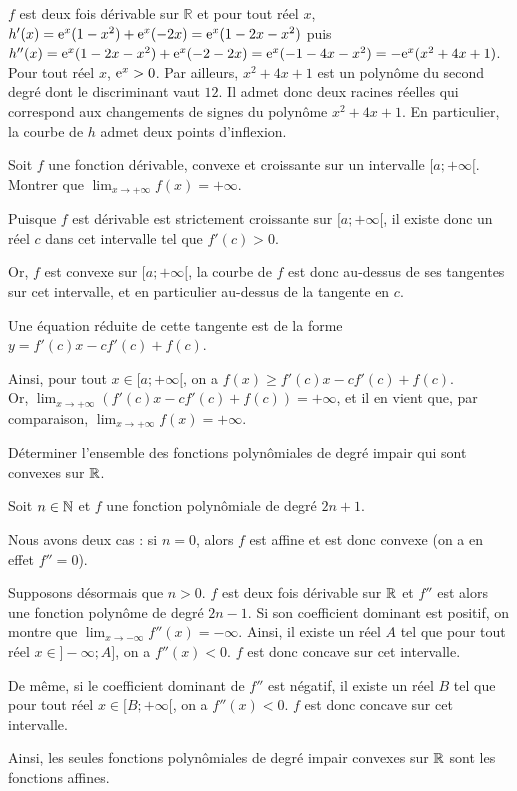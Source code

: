 \documentclass[11pt,fleqn, openany]{book} %
\begin{document}
\begin{solution}$f$ est deux fois dérivable sur $\mathbb{R}$ et pour tout réel $x$, $h'(x)=\mathrm{e}^x(1-x^2)+\mathrm{e}^x(-2x)=\mathrm{e}^x(1-2x-x^2)$ puis $h''(x)=\mathrm{e}^x(1-2x-x^2)+\mathrm{e}^x(-2-2x)=\mathrm{e}^x(-1-4x-x^2)=-\mathrm{e}^x(x^2+4x+1)$. Pour tout réel $x$, $\mathrm{e}^x>0$. Par ailleurs, $x^2+4x+1$ est un polynôme du second degré dont le discriminant vaut $12$. Il admet donc deux racines réelles qui correspond aux changements de signes du polynôme $x^2+4x+1$. En particulier, la courbe de $h$ admet deux points d'inflexion.\end{solution}



\begin{exercise}Soit $f$ une fonction dérivable, convexe et croissante sur un intervalle $[a;+\infty[$. \\Montrer que $\displaystyle\lim_{x \to + \infty}f(x)=+\infty$. \end{exercise}

\begin{solution}
Puisque \(f\) est dérivable est strictement croissante sur \([a;+\infty[\), il existe donc un réel \(c\) dans cet intervalle tel que \(f'(c)>0\).

 Or, \(f\) est convexe sur \([a;+\infty[\), la courbe de \(f\) est donc au-dessus de ses tangentes sur cet intervalle, et en particulier au-dessus de la tangente en \(c\). 

 Une équation réduite de cette tangente est de la forme \(y = f'(c)x -cf'(c)+f(c)\). 

 Ainsi, pour tout \(x \in [a;+\infty[\), on a \(f(x) \geqslant f'(c)x -cf'(c)+f(c)\). \\Or, \(\displaystyle\lim_{x\to +\infty}(f'(c)x -cf'(c)+f(c))=+\infty\), et il en vient que, par comparaison, \(\displaystyle\lim_{x \to + \infty}f(x)=+\infty\).\end{solution}
 
 \begin{exercise}Déterminer l'ensemble des fonctions polynômiales de degré impair qui sont convexes sur $\mathbb{R}$.\newpage \end{exercise}
 
 \begin{solution}
Soit $n\in\mathbb{N}$ et $f$ une fonction polynômiale de degré $2n+1$.

Nous avons deux cas : si $n=0$, alors $f$ est affine et est donc convexe (on a en effet $f''=0$).

Supposons désormais que $n>0$. $f$ est deux fois dérivable sur $\mathbb{R}$ et $f''$ est alors une fonction polynôme de degré $2n-1$. Si son coefficient dominant est positif, on montre que $\displaystyle\lim_{x \to -\infty}f''(x)=-\infty$. Ainsi, il existe un réel $A$ tel que pour tout réel $x \in ]-\infty ; A]$, on a $f''(x)<0$. $f$ est donc concave sur cet intervalle.

De même, si le coefficient dominant de $f''$ est négatif, il existe un réel $B$ tel que pour tout réel $x\in [B;+\infty[$, on a $f''(x)<0$. $f$ est donc concave sur cet intervalle.

Ainsi, les seules fonctions polynômiales de degré impair convexes sur $\mathbb{R}$ sont les fonctions affines.
 \end{solution}
\end{document}
